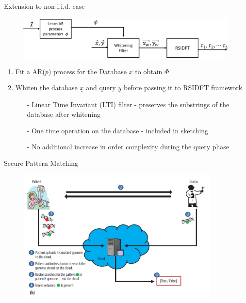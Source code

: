 \documentclass[10pt,xcolor=table]{beamer}
\newcommand{\xv}{\underline{x}}
\newcommand{\yv}{\underline{y}}
\begin{document}
\begin{frame}{Extension to non-i.i.d. case}


	\begin{figure}[t]
		\begin{center}
			\includegraphics[width=4.5in]{nonIID.png}
		\end{center}
	\end{figure}
	

\begin{block}{}
	\begin{enumerate}
		\item Fit a AR($p$) process for the Database $\xv$ to obtain $\Phi$
		\item Whiten the database $\xv$ and query $\yv$ before passing it to RSIDFT framework 
		\begin{itemize}\normalsize
			\item[-] Linear Time Invariant (LTI) filter - preserves the substrings of the database after whitening
			\item[-] One time operation on the database - included in sketching
			\item[-] No additional increase in order complexity during the query phase
		\end{itemize} 
\end{enumerate}
\end{block}
\end{frame}



\begin{frame}{Secure Pattern Matching}
\begin{figure}
  \centering
  \includegraphics[width=4.0in]{doctorpatient}
\end{figure}
\end{frame}
\end{document}
